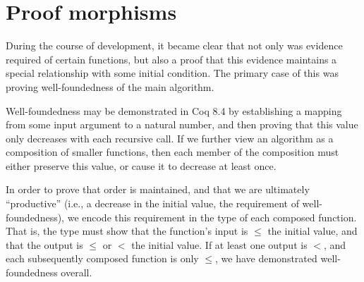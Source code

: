 \documentclass{llncs}
\begin{document}





\section{Proof morphisms}
\label{sec:pfmorph}

During the course of development, it became clear that not only was evidence
required of certain functions, but also a proof that this evidence maintains a
special relationship with some initial condition.  The primary case of this
was proving well-foundedness of the main algorithm.

Well-foundedness may be demonstrated in Coq 8.4 by establishing a mapping from
some input argument to a natural number, and then proving that this value only
decreases with each recursive call.  If we further view an algorithm as a
composition of smaller functions, then each member of the composition must
either preserve this value, or cause it to decrease at least once.

In order to prove that order is maintained, and that we are ultimately
``productive'' (i.e., a decrease in the initial value, the requirement of
well-foundedness), we encode this requirement in the type of each composed
function.  That is, the type must show that the function's input is $\le$ the
initial value, and that the output is $\le$ or $<$ the initial value.  If at
least one output is $<$, and each subsequently composed function is only
$\le$, we have demonstrated well-foundedness overall.
\end{document}
